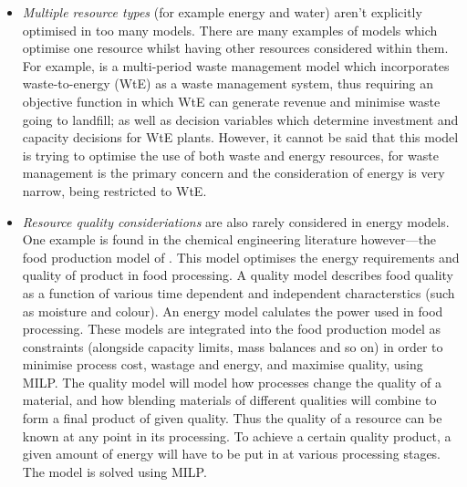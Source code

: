 \begin{itemize}
	\item \emph{Multiple resource types} (for example energy and water) aren't explicitly optimised in too many models. There are many examples of models which optimise one resource whilst having other resources considered within them. For example, \citet{Lu2009} is a multi-period waste management model which incorporates waste-to-energy (WtE) as a waste management system, thus requiring an objective function in which WtE can generate revenue and minimise waste going to landfill; as well as decision variables which determine investment and capacity decisions for WtE plants. However, it cannot be said that this model is trying to optimise the use of both waste and energy resources, for waste management is the primary concern and the consideration of energy is very narrow, being restricted to WtE.
	\item \emph{Resource quality consideriations} are also rarely considered in energy models. One example is found in the chemical engineering literature however---the food production model of \citet{Mehdizadeh2011}. This model optimises the energy requirements and quality of product in food processing. A quality model describes food quality as a function of various time dependent and independent characterstics (such as moisture and colour). An energy model calulates the power used in food processing. These models are integrated into the food production model as constraints (alongside capacity limits, mass balances and so on) in order to minimise process cost, wastage and energy, and maximise quality, using MILP. The quality model will model how processes change the quality of a material, and how blending materials of different qualities will combine to form a final product of given quality. Thus the quality of a resource can be known at any point in its processing. To achieve a certain quality product, a given amount of energy will have to be put in at various processing stages. The model is solved using MILP.
\end{itemize}

